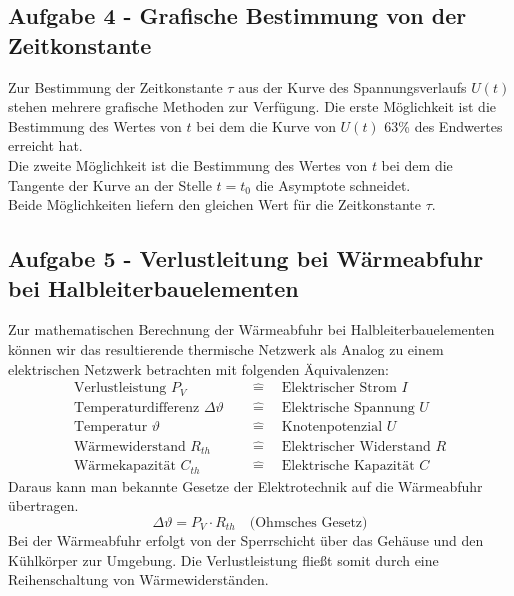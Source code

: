 \subsection{Aufgabe 4 - Grafische Bestimmung von der Zeitkonstante}
\label{sec:vorbereitung_aufgabe4}
Zur Bestimmung der Zeitkonstante $\tau$ aus der Kurve des Spannungsverlaufs $U(t)$ stehen mehrere grafische Methoden zur Verfügung.
Die erste Möglichkeit ist die Bestimmung des Wertes von $t$ bei dem die Kurve von $U(t)$ 63\% des Endwertes erreicht hat. \\
Die zweite Möglichkeit ist die Bestimmung des Wertes von $t$ bei dem die Tangente der Kurve an der Stelle $t=t_0$ die Asymptote schneidet. \\
Beide Möglichkeiten liefern den gleichen Wert für die Zeitkonstante $\tau$.

\subsection{Aufgabe 5 - Verlustleitung bei Wärmeabfuhr bei Halbleiterbauelementen}
Zur mathematischen Berechnung der Wärmeabfuhr bei Halbleiterbauelementen können wir das resultierende thermische Netzwerk als Analog zu einem elektrischen Netzwerk betrachten mit folgenden Äquivalenzen:
\begin{align*}
    \text{Verlustleistung } P_V                  & \quad \hat{=} \quad \text{Elektrischer Strom } I      \\
    \text{Temperaturdifferenz } \Delta \vartheta & \quad \hat{=} \quad \text{Elektrische Spannung } U    \\
    \text{Temperatur } \vartheta                 & \quad \hat{=} \quad \text{Knotenpotenzial } U         \\
    \text{Wärmewiderstand } R_{th}               & \quad \hat{=} \quad \text{Elektrischer Widerstand } R \\
    \text{Wärmekapazität } C_{th}                & \quad \hat{=} \quad \text{Elektrische Kapazität } C
\end{align*}
Daraus kann man bekannte Gesetze der Elektrotechnik auf die Wärmeabfuhr übertragen.
\begin{equation}
    \label{eqn:Ohmsches_Gesetz_Waerme}
    \Delta \vartheta = P_V \cdot R_{th} \quad\text{(Ohmsches Gesetz)}
\end{equation}
Bei der Wärmeabfuhr erfolgt von der Sperrschicht über das Gehäuse und den Kühlkörper zur Umgebung.
Die Verlustleistung fließt somit durch eine Reihenschaltung von Wärmewiderständen.
